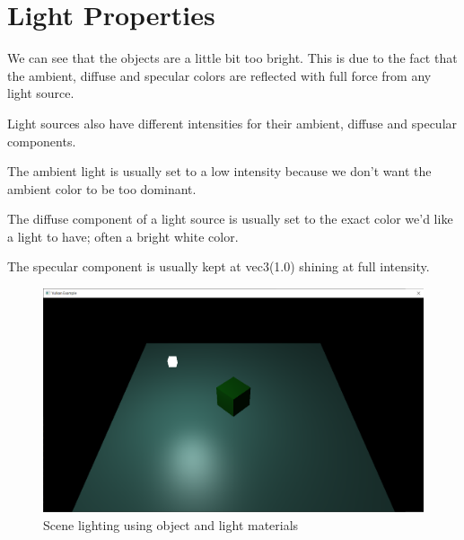 \section{Light Properties}

We can see that the objects are a little bit too bright.
This is due to the fact that the ambient, diffuse and specular colors are reflected
with full force from any light source.

Light sources also have different intensities for their ambient, diffuse and
specular components.

The ambient light is usually set to a low intensity because we don't want the
ambient color to be too dominant.

The diffuse component of a light source is usually set to the exact
color we'd like a light to have; often a bright white color.

The specular component is usually kept at vec3(1.0) shining at full intensity.

\begin{minipage}{\linewidth}{\noindent}
    
\end{minipage}

\begin{minipage}{\linewidth}{\noindent}
    
\end{minipage}

\begin{figure}[ht]
    \centering
    \includegraphics[scale=0.25]{images/ChBlinnPhong/SceneMaterialsLight.png}
    \caption{Scene lighting using object and light materials}
    \label{fig::SceneMaterialsLight}
\end{figure}
